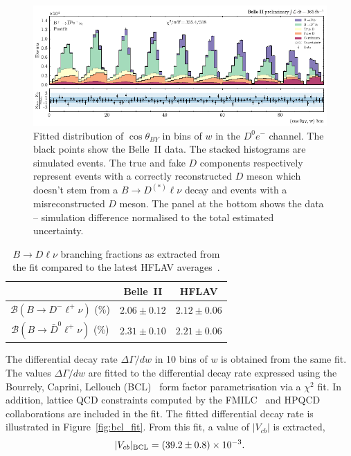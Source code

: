 \documentclass{moriond}
\def\vcb{V_{cb}}
\def\btodlnu{B \to D\ell\nu}
\def\costby{\cos\theta_{BY}}
\begin{document}
\begin{figure}[h!]
    \centering
    \includegraphics[scale=0.9]{Figures/2d_fit.pdf}
    \caption{Fitted distribution of $\costby$ in bins of $w$ in the $D^0e^-$ channel. The black points show the Belle~II data. The stacked histograms are simulated events. The true and fake $D$ components respectively represent events with a correctly reconstructed $D$ meson which doesn't stem from a $B \to D^{(*)} \ell \nu$ decay and events with a misreconstructed $D$ meson. The panel at the bottom shows the data -- simulation difference normalised to the total estimated uncertainty.}
    \label{fig:2d_fit}
\end{figure}
\begin{table}[h!]
    \centering
    \caption{$\btodlnu$ branching fractions as extracted from the fit compared to the latest HFLAV averages~\cite{hflav}.}
    \begin{tabular}{|c c c|}
         \hline
         & Belle~II & HFLAV \\
         \hline
        $\mathcal{B}(B \to D^- \ell^+ \nu)$ (\%) & $2.06 \pm 0.12$ & $2.12 \pm 0.06$ \\
        $\mathcal{B}(B \to \bar{D}^0 \ell^+ \nu)$ (\%) & $2.31 \pm 0.10$ & $2.21 \pm 0.06$ \\
         \hline
    \end{tabular}
    \label{tab:br}
\end{table}
The differential decay rate $\Delta\Gamma/dw$ in 10 bins of $w$ is obtained from the same fit. The values $\Delta\Gamma/dw$ are fitted to the differential decay rate expressed using the Bourrely, Caprini, Lellouch (BCL)~\cite{bcl} form factor parametrisation via a $\chi^2$ fit. In addition, lattice QCD constraints computed by the FMILC~\cite{fmilc} and HPQCD~\cite{hpqcd} collaborations are included in the fit. The fitted differential decay rate is illustrated in Figure~\ref{fig:bcl_fit}. From this fit, a value of $|\vcb|$ is extracted,
\begin{equation}
    |\vcb|_{\rm BCL} = (39.2 \pm 0.8) \times 10^{-3}.
\end{equation}
\end{document}
